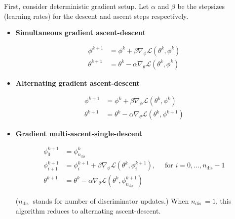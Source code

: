 \begin{definition}
    First, consider deterministic gradient setup. Let $\alpha$ and $\beta$ be the stepsizes (learning rates) for the descent and ascent steps respectively.

    \begin{itemize}
        \item
        \textbf{Simultaneous gradient ascent-descent}

        $$
        \begin{aligned}
        \phi^{k+1} & =\phi^{k}+\beta \nabla_{\phi} \mathcal{L}\left(\theta^{k}, \phi^{k}\right) \\
        \theta^{k+1} & =\theta^{k}-\alpha \nabla_{\theta} \mathcal{L}\left(\theta^{k}, \phi^{k}\right)
        \end{aligned}
        $$
        \item
        \textbf{Alternating gradient ascent-descent}

        $$
        \begin{aligned}
        \phi^{k+1} & =\phi^{k}+\beta \nabla_{\phi} \mathcal{L}\left(\theta^{k}, \phi^{k}\right) \\
        \theta^{k+1} & =\theta^{k}-\alpha \nabla_{\theta} \mathcal{L}\left(\theta^{k}, \phi^{k+1}\right)
        \end{aligned}
        $$
        \item
        \textbf{Gradient multi-ascent-single-descent}

        $$
        \begin{aligned}
        \phi_{0}^{k+1} & =\phi_{n_{\mathrm{dis}}}^{k} \\
        \phi_{i+1}^{k+1} & =\phi_{i}^{k+1}+\beta \nabla_{\phi} \mathcal{L}\left(\theta^{k}, \phi_{i}^{k+1}\right), \quad \text { for } i=0, \ldots, n_{\mathrm{dis}}-1 \\
        \theta^{k+1} & =\theta^{k}-\alpha \nabla_{\theta} \mathcal{L}\left(\theta^{k}, \phi_{n_{\mathrm{dis}}}^{k+1}\right)
        \end{aligned}
        $$

        ($n_{\text {dis }}$ stands for number of discriminator updates.)
        When $n_{\text {dis }}=1$, this algorithm reduces to alternating ascent-descent.
    \end{itemize}
\end{definition}

